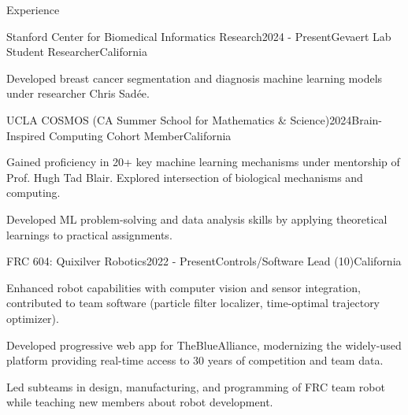 \documentclass[
  11pt, %
]{resume} %
\begin{document}
\sloppy


\begin{rSection}{Experience}


  \begin{rSubsection}{Stanford Center for Biomedical Informatics Research}{2024 - Present}{Gevaert Lab Student Researcher}{California}
    
    \item Developed breast cancer segmentation and diagnosis machine learning models under researcher Chris Sadée.
    
  \end{rSubsection}
        
  \begin{rSubsection}{UCLA COSMOS (CA Summer School for Mathematics \& Science)}{2024}{Brain-Inspired Computing Cohort Member}{California}
    
    \item Gained proficiency in 20+ key machine learning mechanisms under mentorship of Prof. Hugh Tad Blair. Explored intersection of biological mechanisms and computing.
    
    \item Developed ML problem-solving and data analysis skills by applying theoretical learnings to practical assignments.
    
  \end{rSubsection}
        
  \begin{rSubsection}{FRC 604: Quixilver Robotics}{2022 - Present}{Controls/Software Lead (10)}{California}
    
    \item Enhanced robot capabilities with computer vision and sensor integration, contributed to team software (particle filter localizer, time-optimal trajectory optimizer).
    
    \item Developed progressive web app for TheBlueAlliance, modernizing the widely-used platform providing real-time access to 30 years of competition and team data.
    
    \item Led subteams in design, manufacturing, and programming of FRC team robot while teaching new members about robot development.
    
  \end{rSubsection}
        
	
\end{rSection}
\end{document}
